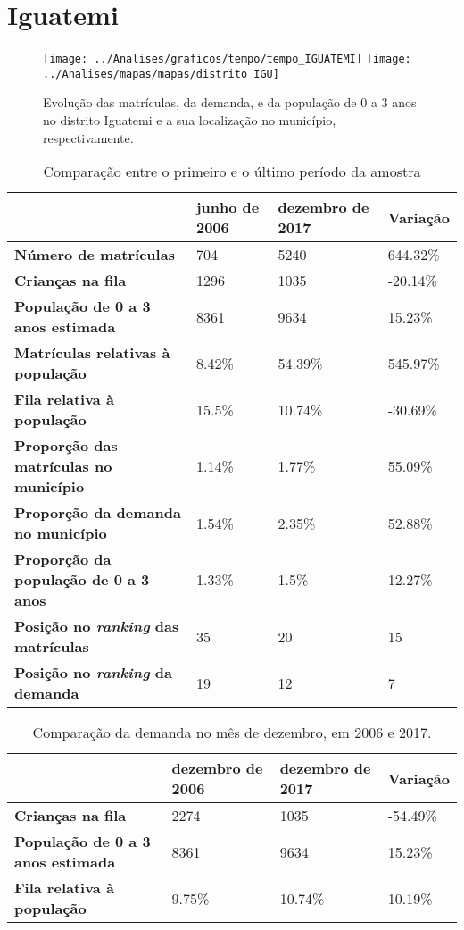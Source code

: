 \section{Iguatemi}
\begin{figure}[H]
\centering
\texttt{[image: ../Analises/graficos/tempo/tempo\_IGUATEMI]}
\texttt{[image: ../Analises/mapas/mapas/distrito\_IGU]}
\caption{Evolução das matrículas, da demanda, e da população de 0 a 3 anos no distrito Iguatemi e a sua localização no município, respectivamente.}
\end{figure}
\begin{table}[H]
\begin{tabular}{l|l|l|l}
\textbf{}                                      & \textbf{junho de 2006}       & \textbf{dezembro de 2017}    & \textbf{Variação} \\ \hline
\textbf{Número de matrículas}                  & 704 & 5240 & 644.32\% \\ \hline
\textbf{Crianças na fila}                      & 1296 & 1035 & -20.14\% \\ \hline
\textbf{População de 0 a 3 anos estimada}      & 8361 & 9634 & 15.23\% \\ \hline
\textbf{Matrículas relativas à população}      & 8.42\% & 54.39\% & 545.97\% \\ \hline
\textbf{Fila relativa à população}             & 15.5\% & 10.74\% & -30.69\% \\ \hline
\textbf{Proporção das matrículas no município} & 1.14\% & 1.77\% & 55.09\% \\ \hline
\textbf{Proporção da demanda no município}     & 1.54\% & 2.35\% & 52.88\% \\ \hline
\textbf{Proporção da população de 0 a 3 anos}  & 1.33\% & 1.5\% & 12.27\% \\ \hline
\textbf{Posição no \textit{ranking} das matrículas}     & 35 & 20 & 15 \\ \hline
\textbf{Posição no \textit{ranking} da demanda}         & 19 & 12 & 7 \\ 
\end{tabular}
\caption{Comparação entre o primeiro e o último período da amostra}
\end{table}
\begin{table}[H]
\begin{tabular}{l|l|l|l}
\textbf{}                                 & \textbf{dezembro de 2006} & \textbf{dezembro de 2017} & \textbf{Variação} \\ \hline
\textbf{Crianças na fila}                      & 2274 & 1035 & -54.49\% \\ \hline
\textbf{População de 0 a 3 anos estimada}      & 8361 & 9634 & 15.23\% \\ \hline
\textbf{Fila relativa à população}             & 9.75\% & 10.74\% & 10.19\% \\
\end{tabular}
\caption{Comparação da demanda no mês de dezembro, em 2006 e 2017.}
\end{table}
